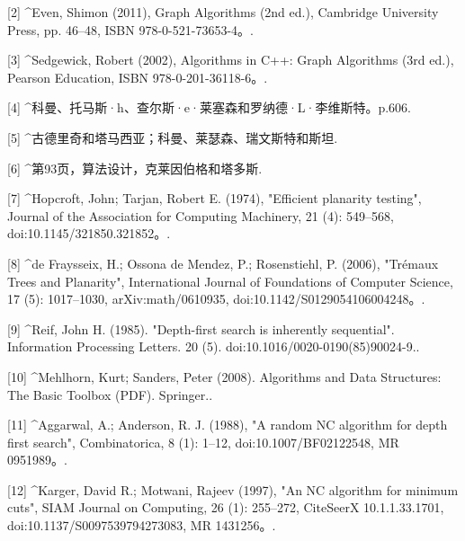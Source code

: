 [2]
^Even, Shimon (2011), Graph Algorithms (2nd ed.), Cambridge University Press, pp. 46–48, ISBN 978-0-521-73653-4。.

[3]
^Sedgewick, Robert (2002), Algorithms in C++: Graph Algorithms (3rd ed.), Pearson Education, ISBN 978-0-201-36118-6。.

[4]
^科曼、托马斯·h、查尔斯·e·莱塞森和罗纳德·L·李维斯特。p.606.


[5]
^古德里奇和塔马西亚；科曼、莱瑟森、瑞文斯特和斯坦.

[6]
^第93页，算法设计，克莱因伯格和塔多斯.

[7]
^Hopcroft, John; Tarjan, Robert E. (1974), "Efficient planarity testing", Journal of the Association for Computing Machinery, 21 (4): 549–568, doi:10.1145/321850.321852。.

[8]
^de Fraysseix, H.; Ossona de Mendez, P.; Rosenstiehl, P. (2006), "Trémaux Trees and Planarity", International Journal of Foundations of Computer Science, 17 (5): 1017–1030, arXiv:math/0610935, doi:10.1142/S0129054106004248。.

[9]
^Reif, John H. (1985). "Depth-first search is inherently sequential". Information Processing Letters. 20 (5). doi:10.1016/0020-0190(85)90024-9..

[10]
^Mehlhorn, Kurt; Sanders, Peter (2008). Algorithms and Data Structures: The Basic Toolbox (PDF). Springer..

[11]
^Aggarwal, A.; Anderson, R. J. (1988), "A random NC algorithm for depth first search", Combinatorica, 8 (1): 1–12, doi:10.1007/BF02122548, MR 0951989。.

[12]
^Karger, David R.; Motwani, Rajeev (1997), "An NC algorithm for minimum cuts", SIAM Journal on Computing, 26 (1): 255–272, CiteSeerX 10.1.1.33.1701, doi:10.1137/S0097539794273083, MR 1431256。.